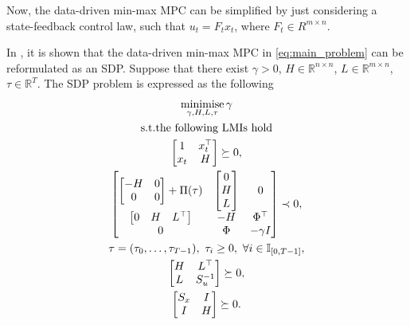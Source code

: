 Now, the data-driven min-max MPC can be simplified by just considering a state-feedback control law, such that $u_t = F_t x_t$, where $F_t \in R^{m \times n}$.

In \cite{xie2024}, it is shown that the data-driven min-max MPC in \autoref{eq:main_problem} can be reformulated as an SDP.
Suppose that there exist $\gamma > 0$, $H \in \mathbb{R}^{n \times n}$, $L \in \mathbb{R}^{m \times n}$, $\tau \in \mathbb{R}^T$.
The SDP problem is expressed as the following
\begin{subequations} \label{eq:final_gamma}
	\begin{gather}
		\operatorname*{minimise}_{\gamma, H, L, \tau} \gamma \\
		\text{s.t.} \nonumber \text{the following LMIs hold} \nonumber
		\\
		\begin{bmatrix} \label{subeq:LMI_b_constraints}
			1 & x_t^\top \\
			x_t & H
		\end{bmatrix} \succeq 0,
		\\
		\begin{bmatrix} \label{subeq:LMI_c_constraints}
			\begin{bmatrix}
				-H & 0 \\
				0 & 0
			\end{bmatrix}
			+
			\Pi(\tau)
			&
			\begin{bmatrix}
				0 \\
				H \\
				L
			\end{bmatrix}
			&
			0 \\
			\begin{bmatrix}
				0 & H & L^\top
			\end{bmatrix}
			& -H & \Phi^\top \\
			0 & \Phi & -\gamma I
		\end{bmatrix} \prec 0,
		\\
		\tau = (\tau_0, \ldots, \tau_{T-1}), \ \tau_i \geq 0, \ \forall i \in \mathbb{I}_{[0, T-1]}, \label{subeq:LMI_d_constraints}
		\\
		\begin{bmatrix}
			H & L^\top \\
			L & S_u^{-1}
		\end{bmatrix} \succeq 0, \label{subeq:LMI_e_constraints}
		\\
		\begin{bmatrix} \label{subeq:LMI_f_constraints}
			S_x & I \\
			I & H
		\end{bmatrix} \succeq 0.
	\end{gather}
\end{subequations}
